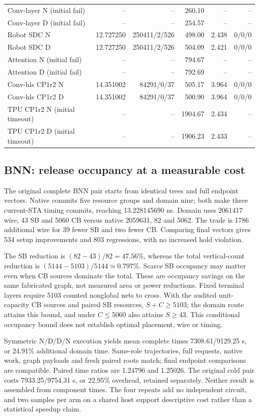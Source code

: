 \documentclass[conference,10pt]{IEEEtran}
\begin{document}
\begin{table}[t]
\begin{tabular}{lrrrrr}
Conv-layer N (initial fail)&--&--&260.10&--&--\\
Conv-layer D (initial fail)&--&--&254.57&--&--\\
Robot SDC N&12.727250&250411/2/526&498.00&2.438&0/0/0\\
Robot SDC D&12.727250&250411/2/526&504.09&2.421&0/0/0\\
Attention N (initial fail)&--&--&794.67&--&--\\
Attention D (initial fail)&--&--&792.69&--&--\\
Conv-hls CP1r2 N&14.351002&84291/0/37&505.17&3.964&0/0/0\\
Conv-hls CP1r2 D&14.351002&84291/0/37&500.90&3.964&0/0/0\\
TPU CP1r2 N (initial timeout)&--&--&1904.67&2.434&--\\
TPU CP1r2 D (initial timeout)&--&--&1906.23&2.433&--\\
\hline\end{tabular}
\end{table}

\subsection{BNN: release occupancy at a measurable cost}
The original complete BNN pair starts from identical trees and full endpoint vectors. Native commits five resource groups and domain nine; both make three current-STA timing commits, reaching 13.228145690 ns. Domain uses 2061417 wire, 43 SB and 5060 CB versus native 2059631, 82 and 5062. The trade is 1786 additional wire for 39 fewer SB and two fewer CB. Comparing final vectors gives 534 setup improvements and 803 regressions, with no increased hold violation.

The SB reduction is $(82-43)/82=47.56\%$, whereas the total vertical-count reduction is $(5144-5103)/5144\simeq0.797\%$. Scarce SB occupancy may matter even when CB sources dominate the total. These are occupancy savings on the same fabricated graph, not measured area or power reductions. Fixed terminal layers require 5103 counted nonglobal nets to cross. With the audited unit-capacity CB sources and paired SB resources, $S+C\ge5103$; the domain route attains this bound, and under $C\le5060$ also attains $S\ge43$. This conditional occupancy bound does not establish optimal placement, wire or timing.

Symmetric N/D/D/N execution yields mean complete times 7308.61/9129.25 s, or 24.91\% additional domain time. Same-role trajectories, full requests, native work, graph payloads and fresh paired roots match; final endpoint comparisons are compatible. Paired time ratios are 1.24796 and 1.25026. The original cold pair costs 7933.25/9754.31 s, or 22.95\% overhead, retained separately. Neither result is assembled from component times. The four repeats add no independent circuit, and two samples per arm on a shared host support descriptive cost rather than a statistical speedup claim.
\end{document}
